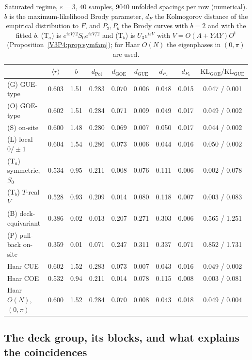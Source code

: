 \begin{table}[ht]
\centering\small
\renewcommand{\arraystretch}{1.15}
\begin{tabular}{lcccccccc}
\toprule
 & $\langle r\rangle$ & $b$ & $d_{\mathrm{Poi}}$ & $d_{\mathrm{GOE}}$ & $d_{\mathrm{GUE}}$ &
$d_{P_2}$ & $d_{P_b}$ & $\mathrm{KL}_{\mathrm{GOE}}/\mathrm{KL}_{\mathrm{GUE}}$\\
\midrule
(G) GUE-type        & 0.603 & 1.51 & 0.283 & 0.070 & 0.006 & 0.048 & 0.015 & 0.047 / 0.001\\
(O) GOE-type        & 0.602 & 1.51 & 0.284 & 0.071 & 0.009 & 0.049 & 0.017 & 0.049 / 0.002\\
(S) on-site         & 0.600 & 1.48 & 0.280 & 0.069 & 0.007 & 0.050 & 0.017 & 0.044 / 0.002\\
(L) local $0/\pm1$  & 0.604 & 1.54 & 0.286 & 0.073 & 0.006 & 0.044 & 0.016 & 0.050 / 0.002\\
(T$_a$) symmetric, $S_0$ & 0.534 & 0.95 & 0.211 & 0.008 & 0.076 & 0.111 & 0.006 & 0.002 / 0.078\\
(T$_b$) $T$-real $V$ & 0.528 & 0.93 & 0.209 & 0.014 & 0.080 & 0.118 & 0.007 & 0.003 / 0.083\\
(B) deck-equivariant & 0.386 & 0.02 & 0.013 & 0.207 & 0.271 & 0.303 & 0.006 & 0.565 / 1.251\\
(P) pull-back on-site & 0.359 & 0.01 & 0.071 & 0.247 & 0.311 & 0.337 & 0.071 & 0.852 / 1.731\\
\midrule
Haar CUE            & 0.602 & 1.52 & 0.283 & 0.073 & 0.007 & 0.043 & 0.016 & 0.049 / 0.002\\
Haar COE            & 0.532 & 0.94 & 0.211 & 0.014 & 0.078 & 0.115 & 0.008 & 0.003 / 0.081\\
Haar $O(N)$, $(0,\pi)$ & 0.600 & 1.52 & 0.284 & 0.070 & 0.008 & 0.043 & 0.018 & 0.049 / 0.004\\
\bottomrule
\end{tabular}
\medskip
\caption{Saturated regime, $\varepsilon=3$, $40$ samples, $9040$ unfolded spacings per row
(numerical). $b$ is the maximum-likelihood Brody parameter, $d_{F}$ the Kolmogorov distance of
the empirical distribution to $F$, and $P_2,P_b$ the Brody curves with $b=2$ and with the fitted
$b$. (T$_a$) is $e^{i\varepsilon V/2}S_0e^{i\varepsilon V/2}$ and (T$_b$) is $U_3e^{i\varepsilon V}$ with
$V=O(A+YAY)O^{t}$ (Proposition~\ref{V3P4:prop:symfam}); for Haar $O(N)$ the eigenphases in $(0,\pi)$
are used.}
\label{V3P4:tab:sat}
\end{table}

\subsection*{The deck group, its blocks, and what explains the coincidences}

